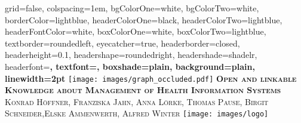 \documentclass[portrait,final,a0paper,fontscale=0.277]{baposter}
\begin{document}
\begin{poster}%
  {
  grid=false,
  colspacing=1em,
  bgColorOne=white,
  bgColorTwo=white,
  borderColor=lightblue,
  headerColorOne=black,
  headerColorTwo=lightblue,
  headerFontColor=white,
  boxColorOne=white,
  boxColorTwo=lightblue,
  textborder=roundedleft,
  eyecatcher=true,
  headerborder=closed,
  headerheight=0.1\textheight,
  headershape=roundedright,
  headershade=shadelr,
  headerfont=\Large\bf\textsc, %
  textfont={\setlength{\parindent}{1.5em}},
  boxshade=plain,
  background=plain,
  linewidth=2pt
  }
  {\texttt{[image: images/graph\_occluded.pdf]}} 
  {\bf\textsc{Open and linkable Knowledge about Management of Health Information Systems}\vspace{0.5em}}
  {\textsc{Konrad Höffner, Franziska Jahn, Anna Lörke, Thomas Pause, Birgit Schneider,Elske
  Ammenwerth, Alfred Winter}}
  {%
    \texttt{[image: images/logo]}
  }

    \newcommand{\colouredcircle}{%
      \tikz{\useasboundingbox (-0.2em,-0.32em) rectangle(0.2em,0.32em); \draw[draw=black,fill=lightblue,line width=0.03em] (0,0) circle(0.18em);}}


\end{poster}
\end{document}
